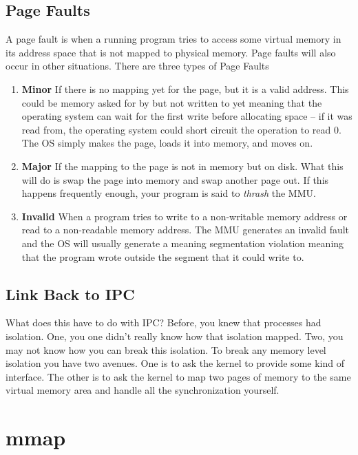 \subsection{Page Faults}

A page fault is when a running program tries to access some virtual memory in its address space that is not mapped to physical memory.
Page faults will also occur in other situations.
There are three types of Page Faults

\begin{enumerate}
\item \textbf{Minor} If there is no mapping yet for the page, but it is a valid address.
  This could be memory asked for by  but not written to yet meaning that the operating system can wait for the first write before allocating space -- if it was read from, the operating system could short circuit the operation to read 0.
  The OS simply makes the page, loads it into memory, and moves on.

\item \textbf{Major} If the mapping to the page is not in memory but on disk.
  What this will do is swap the page into memory and swap another page out.
  If this happens frequently enough, your program is said to \emph{thrash} the MMU.

\item \textbf{Invalid} When a program tries to write to a non-writable memory address or read to a non-readable memory address.
  The MMU generates an invalid fault and the OS will usually generate a  meaning segmentation violation meaning that the program wrote outside the segment that it could write to.

\end{enumerate}

\subsection{Link Back to IPC}

What does this have to do with IPC?
Before, you knew that processes had isolation.
One, you one didn't really know how that isolation mapped.
Two, you may not know how you can break this isolation.
To break any memory level isolation you have two avenues.
One is to ask the kernel to provide some kind of interface.
The other is to ask the kernel to map two pages of memory to the same virtual memory area and handle all the synchronization yourself.

\section{mmap}

